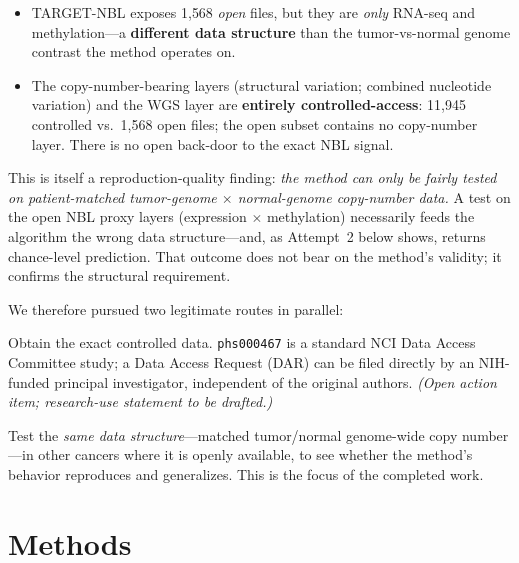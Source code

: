 \documentclass[11pt]{article}
\begin{document}
\begin{itemize}[leftmargin=*]
  \item TARGET-NBL exposes 1{,}568 \emph{open} files, but they are \emph{only}
    RNA-seq and methylation---a \textbf{different data structure} than the
    tumor-vs-normal genome contrast the method operates on.
  \item The copy-number-bearing layers (structural variation; combined
    nucleotide variation) and the WGS layer are \textbf{entirely
    controlled-access}: 11{,}945 controlled vs.\ 1{,}568 open files; the
    open subset contains no copy-number layer. There is no open back-door to the
    exact NBL signal.
\end{itemize}

This is itself a reproduction-quality finding: \emph{the method can only be
fairly tested on patient-matched tumor-genome $\times$ normal-genome copy-number
data.} A test on the open NBL proxy layers (expression $\times$ methylation)
necessarily feeds the algorithm the wrong data structure---and, as Attempt~2
below shows, returns chance-level prediction. That outcome does not bear on the
method's validity; it confirms the structural requirement.

We therefore pursued two legitimate routes in parallel:
\begin{description}[leftmargin=1.5cm]
  \item[Route A (direct).] Obtain the exact controlled data. \texttt{phs000467}
    is a standard NCI Data Access Committee study; a Data Access Request (DAR)
    can be filed directly by an NIH-funded principal investigator, independent of
    the original authors. \emph{(Open action item; research-use statement to be
    drafted.)}
  \item[Route B (generalization on open data).] Test the \emph{same data
    structure}---matched tumor/normal genome-wide copy number---in other cancers
    where it is openly available, to see whether the method's behavior reproduces
    and generalizes. This is the focus of the completed work.
\end{description}

\section{Methods}
\end{document}
